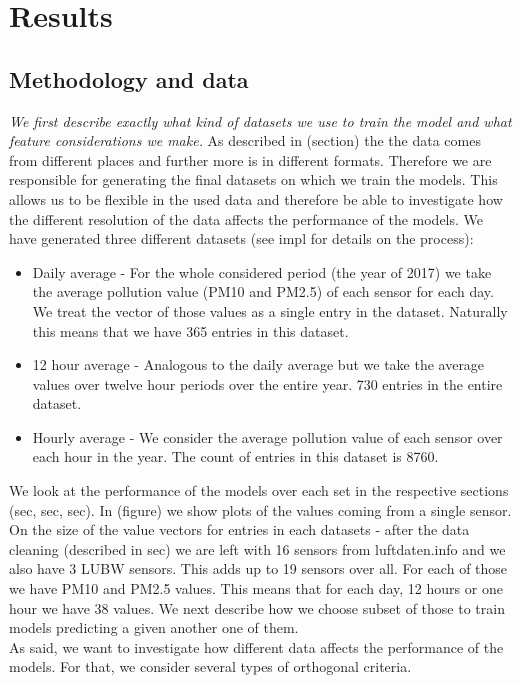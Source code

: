 \documentclass[12pt,a4paper,twoside]{scrartcl}
\numberwithin{equation}{section}
\begin{document}
\section{Results}
\label{sec:res}
\subsection{Methodology and data}
\label{sec:meth}
\noindent
\emph{We first describe exactly what kind of datasets we use to train the model and what feature considerations we make.}
As described in (section) the the data comes from different places and further more is in different formats. Therefore we are responsible for generating the final datasets on which we train the models. This allows us to be flexible in the used data and therefore be able to investigate how the different resolution of the data affects the performance of the models. We have generated three different datasets (see impl for details on the process):
\begin{itemize}
\item Daily average - For the whole considered period (the year of 2017) we take the average pollution value (PM10 and PM2.5) of each sensor for each day. We treat the vector of those values as a single entry in the dataset. Naturally this means that we have 365 entries in this dataset.
\item 12 hour average - Analogous to the daily average but we take the average values over twelve hour periods over the entire year. 730 entries in the entire dataset.
\item Hourly average - We consider the average pollution value of each sensor over each hour in the year. The count of entries in this dataset is 8760.
\end{itemize}
We look at the performance of the models over each set in the respective sections (sec, sec, sec). In (figure) we show plots of the values coming from a single sensor. On the size of the value vectors for entries in each datasets - after the data cleaning (described in sec) we are left with 16 sensors from luftdaten.info and we also have 3 LUBW sensors. This adds up to 19 sensors over all. For each of those we have PM10 and PM2.5 values. This means that for each day, 12 hours or one hour we have 38 values. We next describe how we choose subset of those to train models predicting a given another one of them.
\\
As said, we want to investigate how different data affects the performance of the models. For that, we consider several types of orthogonal criteria.
\end{document}
